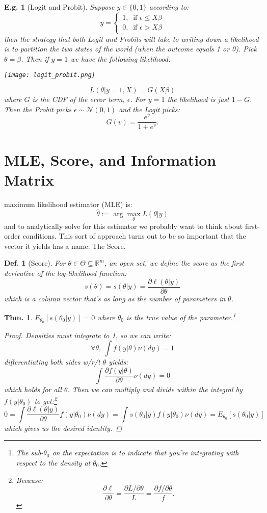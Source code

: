 \documentclass{tufte-book}
\theoremstyle{mytheoremstyle}
\newtheorem*{thm}{Thm.}
\theoremstyle{mylemstyle}
\theoremstyle{mydefstyle}
\newtheorem*{mydef}{Def.}
\newtheorem*{ex}{E.g.}
\begin{document}
\begin{ex}[Logit and Probit] Suppose \(y \in \{0, 1\}\) according to:
	\[y = \begin{cases} 1,\ \text{ if } \epsilon \le X\beta \\ 0,\ \text{ if } \epsilon > X\beta \end{cases} \]
then the strategy that both Logit and Probits will take to writing down a likelihood is to partition the two states of the world (when the outcome equals 1 or 0). Pick \(\theta = \beta\). Then if \(y = 1\) we have the following likelihood: \begin{marginfigure} \texttt{[image: logit\_probit.png]} \caption{The CDF of a logit and probit CDF are plotted. Additionally a Normal CDF with a slightly higher variance is plotted to show how to transform a Probit CDF to a Logit CDF.} \end{marginfigure} 
	\[L(\theta| y = 1, X) = G(X\beta)\]
where \(G\) is the CDF of the error term, \(\epsilon\). For \(y = 1\) the likelihood is just \(1 - G\). Then the Probit picks \(\epsilon \sim \mathcal{N}(0, 1)\) and the Logit picks:
	\[G(v) = \frac{e^v}{1 + e^v} \text{.}\]
\end{ex}

\section{MLE, Score, and Information Matrix}
 maximum likelihood estimator (MLE) is:
	\[\hat{\theta} := \arg \max_{\theta} L(\theta| y)\]
and to analytically solve for this estimator we probably want to think about first-order conditions. This sort of approach turns out to be so important that the vector it yields has a name: The Score.
\begin{mydef}[Score] For \(\theta \in \Theta \subseteq \mathbb{R}^m\), an open set, we define the score as the first derivative of the log-likelihood function:
	\[s(\theta) = s(\theta | y) = \frac{\partial \ell (\theta | y) }{\partial \theta}\]
which is a column vector that's as long as the number of parameters in \(\theta\).
\end{mydef}
\begin{thm} \(E_{\theta_0}[s(\theta_0 | y)] = 0\) where \(\theta_0\) is the true value of the parameter.\footnote{The sub-\(\theta_0\) on the expectation is to indicate that you're integrating with respect to the density at \(\theta_0\).} 
	\begin{proof} Densities must integrate to 1, so we can write:
		\[\forall \theta,\ \int f(y | \theta) \nu(dy) = 1\]
	differentiating both sides w/r/t \(\theta\) yields:
		\[\int \frac{\partial f(y | \theta) }{\partial \theta} \nu(dy) = 0\]
	which holds for all \(\theta\). Then we can multiply and divide within the integral by \(f(y | \theta_0)\) to get:\footnote{Because: \[\frac{\partial \ell}{\partial \theta} = \frac{\partial L/\partial \theta}{L} = \frac{\partial f/\partial \theta}{f} \text{.}\]}
		\[0 = \int \frac{\partial \ell(\theta| y)}{\partial \theta} f(y | \theta_0) \nu(dy) = \int s(\theta_0 | y) f(y| \theta_0) \nu(dy) = E_{\theta_0} [s(\theta_0 | y)]\]
	which gives us the desired identity. 
	\end{proof}
\end{thm}
\end{document}
